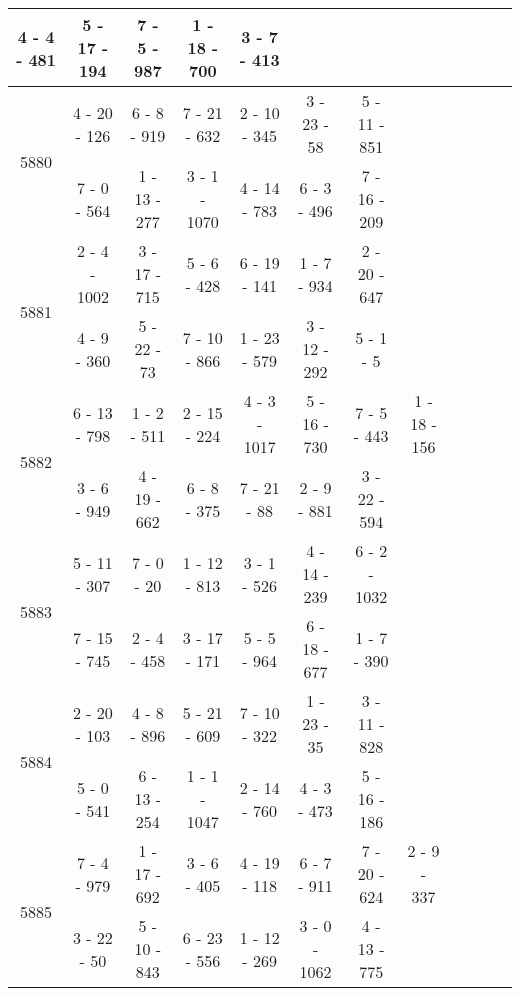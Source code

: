 \begin{longtable}{c | c | c | c | c | c | c | c | c | c | c | c}
4 - 4 - 481
&
5 - 17 - 194
&
7 - 5 - 987
&
1 - 18 - 700
&
3 - 7 - 413
&\space\\\hline
\multirow{2}{*}{5880}
& 4 - 20 - 126
&
6 - 8 - 919
&
7 - 21 - 632
&
2 - 10 - 345
&
3 - 23 - 58
&
5 - 11 - 851
&\space\\* \space
&
7 - 0 - 564
&
1 - 13 - 277
&
3 - 1 - 1070
&
4 - 14 - 783
&
6 - 3 - 496
&
7 - 16 - 209
&\space\\\hline
\multirow{2}{*}{5881}
& 2 - 4 - 1002
&
3 - 17 - 715
&
5 - 6 - 428
&
6 - 19 - 141
&
1 - 7 - 934
&
2 - 20 - 647
&\space\\* \space
&
4 - 9 - 360
&
5 - 22 - 73
&
7 - 10 - 866
&
1 - 23 - 579
&
3 - 12 - 292
&
5 - 1 - 5
&\space\\\hline
\multirow{2}{*}{5882}
& 6 - 13 - 798
&
1 - 2 - 511
&
2 - 15 - 224
&
4 - 3 - 1017
&
5 - 16 - 730
&
7 - 5 - 443
&
1 - 18 - 156
\\* \space
&
3 - 6 - 949
&
4 - 19 - 662
&
6 - 8 - 375
&
7 - 21 - 88
&
2 - 9 - 881
&
3 - 22 - 594
&\space\\\hline
\multirow{2}{*}{5883}
& 5 - 11 - 307
&
7 - 0 - 20
&
1 - 12 - 813
&
3 - 1 - 526
&
4 - 14 - 239
&
6 - 2 - 1032
&\space\\* \space
&
7 - 15 - 745
&
2 - 4 - 458
&
3 - 17 - 171
&
5 - 5 - 964
&
6 - 18 - 677
&
1 - 7 - 390
&\space\\\hline
\multirow{2}{*}{5884}
& 2 - 20 - 103
&
4 - 8 - 896
&
5 - 21 - 609
&
7 - 10 - 322
&
1 - 23 - 35
&
3 - 11 - 828
&\space\\* \space
&
5 - 0 - 541
&
6 - 13 - 254
&
1 - 1 - 1047
&
2 - 14 - 760
&
4 - 3 - 473
&
5 - 16 - 186
&\space\\\hline
\multirow{2}{*}{5885}
& 7 - 4 - 979
&
1 - 17 - 692
&
3 - 6 - 405
&
4 - 19 - 118
&
6 - 7 - 911
&
7 - 20 - 624
&
2 - 9 - 337
\\* \space
&
3 - 22 - 50
&
5 - 10 - 843
&
6 - 23 - 556
&
1 - 12 - 269
&
3 - 0 - 1062
&
4 - 13 - 775
&\space\\\hline

\end{longtable}
